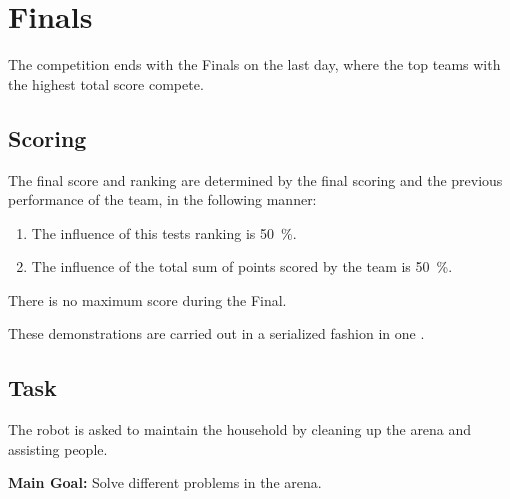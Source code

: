\chapter{Finals}\label{test:final}

The competition ends with the Finals on the last day, where the top teams with the highest total score compete.

\section{Scoring}
The final score and ranking are determined by the final scoring and the previous performance of the team, in the following manner:

\begin{enumerate}
  \item The influence of this tests ranking is \SI{50}{\percent}.
  \item The influence of the total sum of points scored by the team is \SI{50}{\percent}.
\end{enumerate}

There is no maximum score during the Final.

These demonstrations are carried out in a serialized fashion in one \Arena{}.

\section{Task}
The robot is asked to maintain the household by cleaning up the arena and assisting people.

\noindent \textbf{Main Goal:} Solve different problems in the arena.\\

